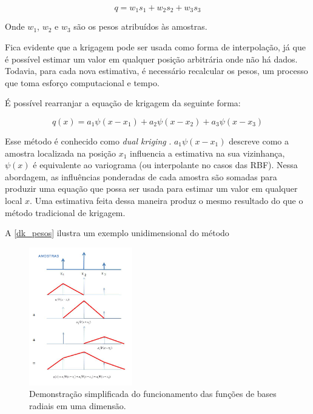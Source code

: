 \begin{equation}
q=w_1s_1+w_2s_2+w_3s_3
\end{equation}

Onde $w_1$, $w_2$ e $w_3$ são os pesos atribuídos às amostras.

Fica evidente que a krigagem pode ser usada como forma de interpolação, já que é possível estimar um valor em qualquer posição arbitrária onde não há dados. Todavia, para cada nova estimativa, é necessário recalcular os pesos, um processo que toma esforço computacional e tempo.

É possível rearranjar a equação de krigagem da seguinte forma:

\begin{equation}
q(x)=a_1\psi(x-x_1)+a_2\psi(x-x_2)+a_3\psi(x-x_3)
\end{equation}

Esse método é conhecido como \textit{dual kriging} \cite{galli1984dual}. $a_1\psi(x-x_1)$ descreve como a amostra localizada na posição $x_1$ influencia a estimativa na sua vizinhança, $\psi(x)$ é equivalente ao variograma (ou interpolante no casos das RBF). Nessa abordagem, as influências ponderadas de cada amostra são somadas para produzir uma equação que possa ser usada para estimar um valor em qualquer local $x$. Uma estimativa feita dessa maneira produz o mesmo resultado do que o método tradicional de krigagem. 

A \autoref{dk_pesos} ilustra um exemplo unidimensional do método

\begin{figure}[!htb]
	\caption{\label{dk_pesos}Demonstração simplificada do funcionamento das funções de bases radiais em uma dimensão.}
	\begin{center}
		\includegraphics[width=0.4\textwidth]{revisao_bibliografica/dual_krig_pesos}
	\end{center}
\end{figure}

